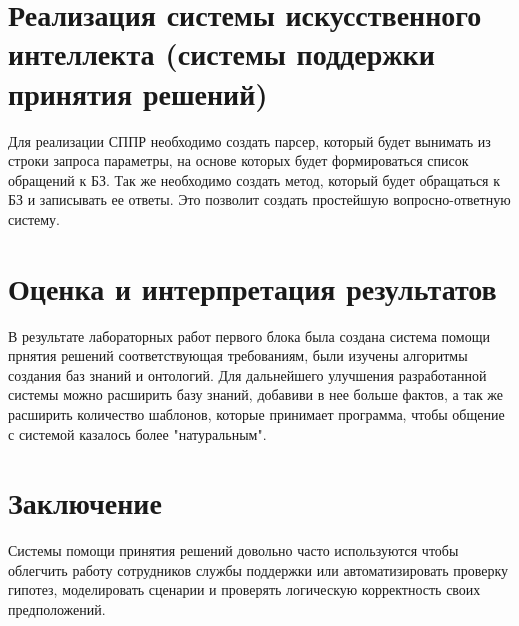 \documentclass{article}
\begin{document}
\section{Реализация системы искусственного интеллекта (системы поддержки принятия решений)}
Для реализации СППР необходимо создать парсер, который будет вынимать из строки запроса параметры, на основе которых будет формироваться список обращений к БЗ. Так же необходимо создать метод, который будет обращаться к БЗ и записывать ее ответы. Это позволит создать простейшую вопросно-ответную систему.
\section{Оценка и интерпретация результатов}
В результате лабораторных работ первого блока была создана система помощи прнятия решений соответствующая требованиям, были изучены алгоритмы создания баз знаний и онтологий. Для дальнейшего улучшения разработанной системы можно расширить базу знаний, добавиви в нее больше фактов, а так же расширить количество шаблонов, которые принимает программа, чтобы общение с системой казалось более "натуральным".
\section{Заключение}
Системы помощи принятия решений довольно часто используются чтобы облегчить работу сотрудников службы поддержки или автоматизировать проверку гипотез, моделировать сценарии и проверять логическую корректность своих предположений.
\end{document}
